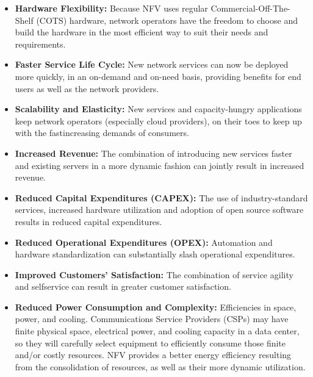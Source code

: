 \begin{itemize}
\item \textbf{Hardware Flexibility:} Because NFV uses regular Commercial-Off-The-Shelf (COTS)
hardware, network operators have the freedom to choose and build the hardware in
the most efficient way to suit their needs and requirements.
\item \textbf{Faster Service Life Cycle:} New network services can now be deployed more quickly,
in an on-demand and on-need basis, providing benefits for end users as well as the
network providers.
\item \textbf{Scalability and Elasticity:} New services and capacity-hungry applications keep network operators (especially cloud providers), on their toes to keep up with the fastincreasing demands of consumers.
\item \textbf{Increased Revenue:} The combination of introducing new services faster and existing
servers in a more dynamic fashion can jointly result in increased revenue.
\item \textbf{Reduced Capital Expenditures (CAPEX):} The use of industry-standard services,
increased hardware utilization and adoption of open source software results in reduced capital expenditures.
\item \textbf{Reduced Operational Expenditures (OPEX):} Automation and hardware standardization can substantially slash operational expenditures.
\item \textbf{Improved Customers' Satisfaction:} The combination of service agility and selfservice can result in greater customer satisfaction.
\item \textbf{Reduced Power Consumption and Complexity:} Efficiencies in space, power, and
cooling. Communications Service Providers (CSPs) may have finite physical space,
electrical power, and cooling capacity in a data center, so they will carefully select
equipment to efficiently consume those finite and/or costly resources. NFV provides
a better energy efficiency resulting from the consolidation of resources, as well as
their more dynamic utilization.
\end{itemize}
